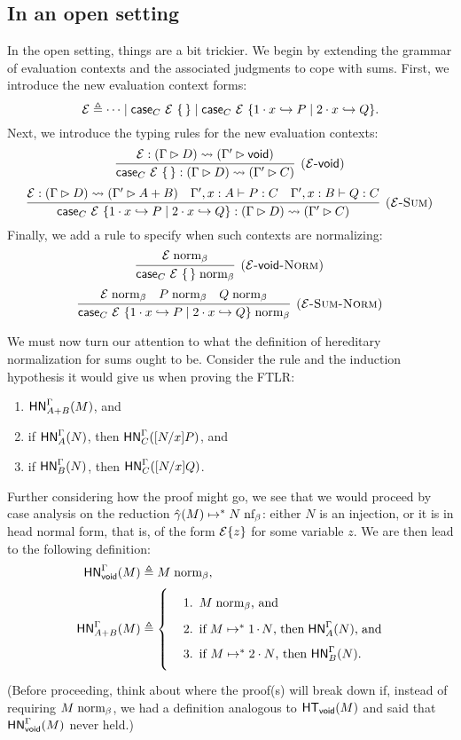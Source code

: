 \documentclass{article}
\begin{document}
\subsection{In an open setting}

In the open setting, things are a bit trickier.
We begin by extending the grammar of evaluation contexts and the associated judgments to cope with sums.
First, we introduce the new evaluation context forms:
\[
  \mathcal{E} \triangleq \dotsb \mid \mathsf{case}_{C}\ \mathcal{E}\ \{\,\} \mid \mathsf{case}_{C}\ \mathcal{E}\ \{1\cdot x \hookrightarrow P \mid 2\cdot x \hookrightarrow Q\}.
\]
Next, we introduce the typing rules for the new evaluation contexts:
\[
  \infer[\rn{$\E$-$\void$}]{
    \hasC{\vcase{C}{\E}}{\Gamma}{D}{\Gamma'}{C}
  }{
    \hasC{\E}{\Gamma}{D}{\Gamma'}{\void}
  }
\]
\[
  \infer[\rn{$\E$-Sum}]{
    \hasC{\scase{C}{\E}{x}{P}{Q}}{\Gamma}{D}{\Gamma'}{C}
  }{
    \hasC{\E}{\Gamma}{D}{\Gamma'}{A + B}
    &
    \hasEF{\Gamma', x:A}{P}{C}
    &
    \hasEF{\Gamma', x:B}{Q}{C}
  }
\]
Finally, we add a rule to specify when such contexts are normalizing:
\[
  \infer[\rn{$\E$-$\void$-Norm}]{
    \bnorm{\vcase{C}{\E}}
  }{
    \bnorm{\E}
  }
\]
\[
  \infer[\rn{$\E$-Sum-Norm}]{
    \bnorm{\scase{C}{\E}{x}{P}{Q}}
  }{
    \bnorm{\E}
    &
    \bnorm{P}
    &
    \bnorm{Q}
  }
\]

We must now turn our attention to what the definition of hereditary normalization for sums ought to be.
Consider the rule  and the induction hypothesis it would give us when proving the FTLR:
\begin{enumerate}
\item $\mathsf{HN}^{\Gamma}_{A + B}(M)$, and
\item if $\mathsf{HN}^{\Gamma}_{A}(N)$, then $\mathsf{HN}^{\Gamma}_{C}([N/x]P)$, and
\item if $\mathsf{HN}^{\Gamma}_{B}(N)$, then $\mathsf{HN}^{\Gamma}_{C}([N/x]Q)$.
\end{enumerate}
Further considering how the proof might go, we see that we would proceed by case analysis on the reduction $\hat\gamma(M) \mapsto^* N \mathrel{\text{nf}_\beta}$: either $N$ is an injection, or it is in head normal form, that is, of the form $\mathcal{E}\{z\}$ for some variable $z$.
We are then lead to the following definition:
\begin{align*}
  \hnorm{\Gamma}{\void}{M} &\triangleq \bnorm{M},\\
  \hnorm{\Gamma}{A+B}{M} &\triangleq \left\{\parbox{0.5\linewidth}{\begin{enumerate}
      \item $\bnorm{M}$, and
      \item if $\steps{M}{\inl{N}}$, then $\hnorm{\Gamma}{A}{N}$, and
      \item if $\steps{M}{\inr{N}}$, then $\hnorm{\Gamma}{B}{N}$.
      \end{enumerate}}\right.
\end{align*}
(Before proceeding, think about where the proof(s) will break down if, instead of requiring $M \mathrel{\text{norm}_\beta}$, we had a definition analogous to $\mathsf{HT}_{\mathsf{void}}(M)$ and said that $\mathsf{HN}^{\Gamma}_{\mathsf{void}}(M)$ never held.)
\end{document}
